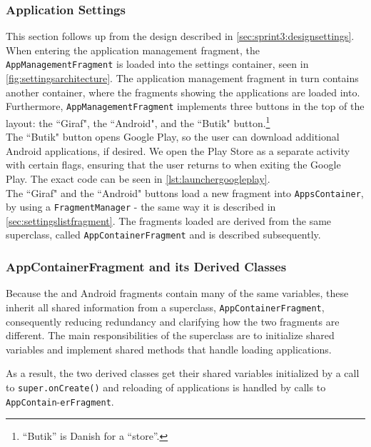 \subsubsection{Application Settings}
This section follows up from the design described in \cref{sec:sprint3:designsettings}.
When entering the application management fragment, the \lstinline!AppManagementFragment! is loaded into the settings container, seen in \cref{fig:settingsarchitecture}.
The application management fragment in turn contains another container, where the fragments showing the applications are loaded into.
Furthermore, \lstinline!AppManagementFragment! implements three buttons in the top of the layout: the ``Giraf", the ``Android", and the ``Butik" button.\footnote{``Butik'' is Danish for a ``store''.}\\

The ``Butik" button opens Google Play, so the user can download additional Android applications, if desired. 
We open the Play Store as a separate activity with certain flags, ensuring that the user returns to \launcher when exiting the Google Play.
The exact code can be seen in \cref{lst:launchergoogleplay}.\\

The ``Giraf" and the ``Android" buttons load a new fragment into  \lstinline!AppsContainer!, by using a \lstinline!FragmentManager! - the same way it is described in \cref{sec:settingslistfragment}.
The fragments loaded are derived from the same superclass, called \lstinline|AppContainerFragment| and is described subsequently.

\subsubsection{AppContainerFragment and its Derived Classes}

Because the \giraf and Android fragments contain many of the same variables, these inherit all shared information from a superclass, \lstinline!AppContainerFragment!, consequently reducing redundancy and clarifying how the two fragments are different.
The main responsibilities of the superclass are to initialize shared variables and implement shared methods that handle loading applications.

As a result, the two derived classes get their shared variables initialized by a call to \lstinline!super.onCreate()! and reloading of applications is handled by calls to \lstinline!AppContain!-\lstinline!erFragment!. \\


